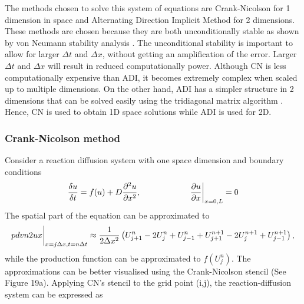 The methods chosen to solve this system of equations are Crank-Nicolson for 1 dimension in space and Alternating Direction Implicit Method for 2 dimensions. These methods are chosen because they are both unconditionally stable as shown by von Neumann stability analysis \parencite{strikwerda2004finite}. The unconditional stability is important to allow for larger $\Delta t$ and $\Delta x$, without getting an amplification of the error. Larger $\Delta t$ and $\Delta x$ will result in reduced computationally power. Although CN is less computationally expensive than ADI, it becomes extremely complex when scaled up to multiple dimensions. On the other hand, ADI has a simpler structure in 2 dimensions that can be solved easily using the tridiagonal matrix algorithm \parencite{Flaherty}. Hence, CN is used to obtain 1D space solutions while ADI is used for 2D.
\subsubsection{Crank-Nicolson method}\label{cranknicolson}
Consider a reaction diffusion system with one space dimension and boundary conditions
\begin{equation}
    \frac{\delta u}{\delta t} =  f(u) + D\frac{\partial^{2} {u}}{\partial {x}^{2}},   \quad \quad \quad \quad \quad \quad \pdv{u}{x}\biggr\rvert_{x=0,L}=0
\end{equation}
The spatial part of the equation can be approximated to
\begin{equation}
    \\pdvn{2}{u}{x} \biggr\rvert_{x=j\Delta x,t=n\Delta t} \approx \frac{1}{2\Delta x^{2}}\left( U^{n}_{j+1} -  2U^{n}_{j} + U^{n}_{j-1} + U^{n+1}_{j+1} - 2U^{n+1}_{j} + U^{n+1}_{j-1}\right),
\end{equation}
while the production function can be approximated to $f ( U^{n}_{j})$.  The approximations can be better visualised using the Crank-Nicolson stencil (See Figure 19a). Applying CN's stencil to the grid point (i,j), the reaction-diffusion system can be expressed as


